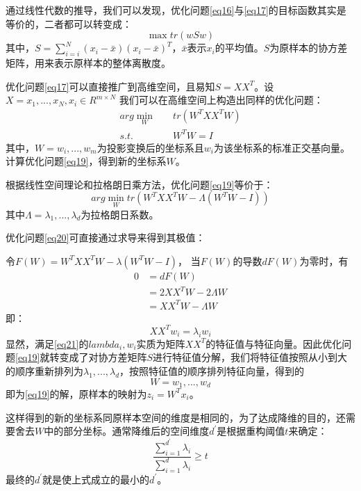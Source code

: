 \documentclass[12pt,a4paper]{article}
\begin{document}
通过线性代数的推导，我们可以发现，优化问题\eqref{eq16}与\eqref{eq17}的目标函数其实是等价的，二者都可以转变成：
\begin{equation}
\label{eq18}
\max tr(w S w)
\end{equation}
其中，$S = \sum_{i = i}^{N}(x_{i} - \bar{x})(x_{i} - \bar{x})^{T}$，$\bar{x}$表示$x_{i}$的平均值。$S$为原样本的协方差矩阵，用来表示原样本的整体离散度。

优化问题\eqref{eq17}可以直接推广到高维空间，且易知$S = XX^{T}$。设$X = {x_{1}, ... , x_{N}}, x_{i} \in R^{m  \times N}$ 我们可以在高维空间上构造出同样的优化问题：
\begin{equation}
\label{eq19}
\begin{split}
arg\min_{W} & \quad tr(W^{T}XX^{T}W) \\
s.t. & \quad W^{T}W = I
\end{split}
\end{equation}
其中，$W = {w_{i}, ... , w_{m}}$为投影变换后的坐标系且$w_{i}$为该坐标系的标准正交基向量。计算优化问题\eqref{eq19}，得到新的坐标系$W$。

根据线性空间理论和拉格朗日乘方法，优化问题\eqref{eq19}等价于：
\begin{equation}
\label{eq20}
arg \min_{W} tr(W^{T}XX^{T}W - \Lambda (W^{T}W - I))
\end{equation}
其中$\Lambda = {\lambda_{1}, ... , \lambda_{d}}$为拉格朗日系数。

优化问题\eqref{eq20}可直接通过求导来得到其极值：

令$F(W) = W^{T}XX^{T}W - \lambda (W^{T}W - I)$，
当$F(W)$的导数$dF(W)$为零时，有
\begin{align*}
0 &= dF(W)\\
  &= 2XX^{T}W - 2\Lambda W\\
  &= XX^{T}W - \Lambda W  
\end{align*}
即：
\begin{equation}
\label{eq21}
XX^{T}w_{i} = \lambda_{i} w_{i}
\end{equation}
显然，满足\eqref{eq21}的$lambda_{i}, w_{i}$实质为矩阵$XX^{T}$的特征值与特征向量。因此优化问题\eqref{eq19}就转变成了对协方差矩阵$S$进行特征值分解，我们将特征值按照从小到大的顺序重新排列为${\lambda_{1}, ... , \lambda_{d}}$，按照特征值的顺序排列特征向量，得到的
\begin{equation*}
W = {w_{1}, ... , w_{d}}
\end{equation*}
即为\eqref{eq19}的解，原样本的映射为$z_{i} = W^{T}x_{i}$。


这样得到的新的坐标系同原样本空间的维度是相同的，为了达成降维的目的，还需要舍去$W$中的部分坐标。通常降维后的空间维度$d^{'}$是根据重构阈值$t$来确定：
\begin{equation}
\label{eq22}
\frac{\sum_{i = 1}^{d^{'}} \lambda_{i}}{\sum_{i = 1}^{d} \lambda_{i}} \geq t
\end{equation}
最终的$d^{'}$就是使上式成立的最小的$d^{'}$。
\end{document}

